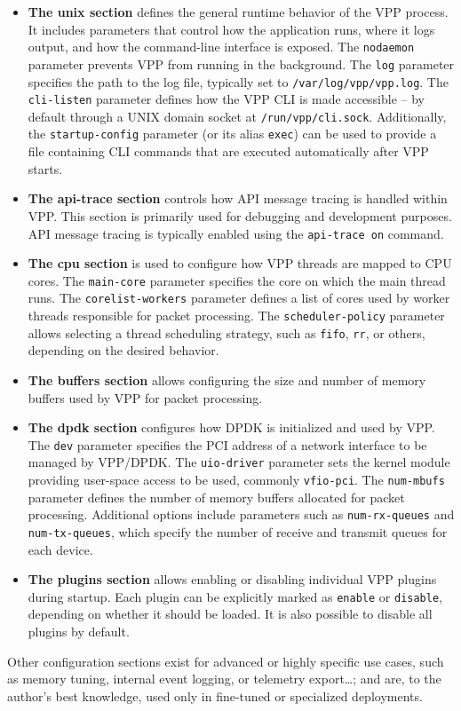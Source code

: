 \begin{itemize}
  \item \textbf{The unix section} defines the general runtime behavior of the VPP process. 
It includes parameters that control how the application runs, where it logs output, and how the command-line interface is exposed. 
The \texttt{nodaemon} parameter prevents VPP from running in the background. 
The \texttt{log} parameter specifies the path to the log file, typically set to \texttt{/var/log/vpp/vpp.log}. 
The \texttt{cli-listen} parameter defines how the VPP CLI is made accessible -- by default through a UNIX domain socket at \texttt{/run/vpp/cli.sock}. 
Additionally, the \texttt{startup-config} parameter (or its alias \texttt{exec}) can be used to provide a file containing CLI commands that are executed automatically after VPP starts.

  \item \textbf{The api-trace section} controls how API message tracing is handled within VPP.  
This section is primarily used for debugging and development purposes. 
API message tracing is typically enabled using the \texttt{api-trace on} command.

  \item \textbf{The cpu section} is used to configure how VPP threads are mapped to CPU cores.  
The \texttt{main-core} parameter specifies the core on which the main thread runs.  
The \texttt{corelist-workers} parameter defines a list of cores used by worker threads responsible for packet processing.  
The \texttt{scheduler-policy} parameter allows selecting a thread scheduling strategy, such as \texttt{fifo}, \texttt{rr}, or others, depending on the desired behavior.

  \item \textbf{The buffers section} allows configuring the size and number of memory buffers used by VPP for packet processing.  

  \item \textbf{The dpdk section} configures how DPDK is initialized and used by VPP.
The \texttt{dev} parameter specifies the PCI address of a network interface to be managed by VPP/DPDK.  
The \texttt{uio-driver} parameter sets the kernel module providing user-space access to be used, commonly \texttt{vfio-pci}.  
The \texttt{num-mbufs} parameter defines the number of memory buffers allocated for packet processing.  
Additional options include parameters such as \texttt{num-rx-queues} and \texttt{num-tx-queues}, which specify the number of receive and transmit queues for each device.

  \item \textbf{The plugins section} allows enabling or disabling individual VPP plugins during startup.  
Each plugin can be explicitly marked as \texttt{enable} or \texttt{disable}, depending on whether it should be loaded. It is also possible to disable all plugins by default.  

\end{itemize}

Other configuration sections exist for advanced or highly specific use cases, such as memory tuning, internal event logging, or telemetry export\dots; 
and are, to the author's best knowledge, used only in fine-tuned or specialized deployments.












